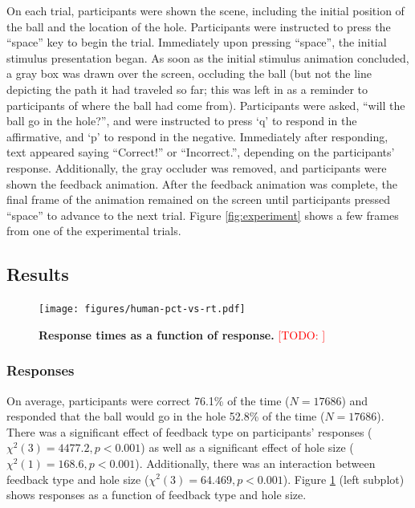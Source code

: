 \documentclass[11pt]{article}
\newcommand{\TODO}[1]{\textcolor{red}{[TODO: #1]}}
\begin{document}
On each trial, participants were shown the scene, including the initial position of the ball and the location of the hole. Participants were instructed to press the ``space'' key to begin the trial. Immediately upon pressing ``space'', the initial stimulus presentation began. As soon as the initial stimulus animation concluded, a gray box was drawn over the screen, occluding the ball (but not the line depicting the path it had traveled so far; this was left in as a reminder to participants of where the ball had come from). Participants were asked, ``will the ball go in the hole?'', and were instructed to press `q' to respond in the affirmative, and `p' to respond in the negative. Immediately after responding, text appeared saying ``Correct!'' or ``Incorrect.'', depending on the participants' response. Additionally, the gray occluder was removed, and participants were shown the feedback animation. After the feedback animation was complete, the final frame of the animation remained on the screen until participants pressed ``space'' to advance to the next trial. Figure \ref{fig:experiment} shows a few frames from one of the experimental trials.

\subsection{Results}

\begin{figure}[t]
    \begin{center}
        \texttt{[image: figures/human-pct-vs-rt.pdf]}
        \caption{\textbf{Response times as a function of response.} \TODO{}}
        \label{fig:pct-vs-rt}
    \end{center}
\end{figure}

\subsubsection{Responses}

On average, participants were correct 76.1\% of the time ($N=17686$) and responded that the ball would go in the hole 52.8\% of the time ($N=17686$). There was a significant effect of feedback type on participants' responses ($\chi^2(3)=4477.2, p<0.001$) as well as a significant effect of hole size ($\chi^2(1)=168.6, p<0.001$). Additionally, there was an interaction between feedback type and hole size ($\chi^2(3)=64.469, p<0.001$). Figure \ref{fig:pct-vs-rt} (left subplot) shows responses as a function of feedback type and hole size.
\end{document}
